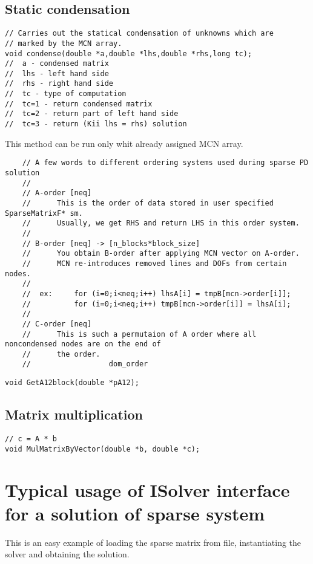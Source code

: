\documentclass[12pt]{article}
\begin{document}
\subsection{Static condensation}
\begin{verbatim}
// Carries out the statical condensation of unknowns which are 
// marked by the MCN array.
void condense(double *a,double *lhs,double *rhs,long tc);
//  a - condensed matrix
//  lhs - left hand side
//  rhs - right hand side
//  tc - type of computation
//  tc=1 - return condensed matrix
//  tc=2 - return part of left hand side
//  tc=3 - return (Kii lhs = rhs) solution
\end{verbatim}
This method can be run only whit already assigned MCN array.

\begin{verbatim}
	// A few words to different ordering systems used during sparse PD solution
	//
	// A-order [neq]  
	//		This is the order of data stored in user specified SparseMatrixF* sm.
	//		Usually, we get RHS and return LHS in this order system.
	//
	// B-order [neq] -> [n_blocks*block_size]
	//		You obtain B-order after applying MCN vector on A-order. 
	//		MCN re-introduces removed lines and DOFs from certain nodes.
	//
	//	ex:		for (i=0;i<neq;i++) lhsA[i] = tmpB[mcn->order[i]];
	//			for (i=0;i<neq;i++) tmpB[mcn->order[i]] = lhsA[i];
	//
	// C-order [neq]
	//		This is such a permutaion of A order where all noncondensed nodes are on the end of 
	//		the order.
	//					dom_order
\end{verbatim}

\begin{verbatim}
void GetA12block(double *pA12);
\end{verbatim}


\subsection{Matrix multiplication}
\begin{verbatim}
// c = A * b
void MulMatrixByVector(double *b, double *c);
\end{verbatim}


\section{Typical usage of ISolver interface for a solution of sparse system}

This is an easy example of loading the sparse matrix from file, instantiating the solver and obtaining the solution.
\end{document}
